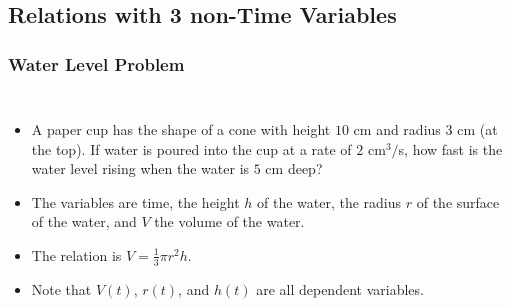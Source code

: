 \documentclass[serif,ignorenonframetext]{beamer}
\newcommand{\ds}{\displaystyle}
\begin{document}
\begin{frame}
\begin{columns}
  \end{columns}
\end{frame}


\subsection{Relations with 3 non-Time Variables}

\begin{frame}
  \frametitle{Water Level Problem}
  \begin{columns}
  \begin{itemize}[<+->]
  \item A paper cup has the shape of a cone with height $10$ cm and
    radius $3$ cm (at the top).  If water is poured into the cup at
    a rate of $2$ cm$^3/$s, how fast is the water level rising when
    the water is $5$ cm deep?
  \item The variables are time, the height $h$ of the water, the 
    radius $r$ of the surface of the water, and $V$ the volume of 
    the water.
  \item The relation is $\ds V=\frac{1}{3}\pi r^2 h$.
  \item Note that $V(t)$, $r(t)$, and $h(t)$ are all dependent
    variables.  
  \end{itemize}
  \end{columns}
\end{frame}
\end{document}
